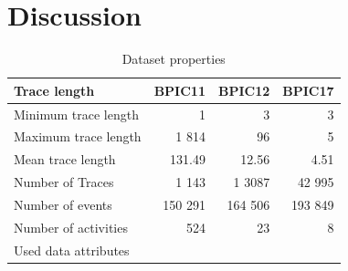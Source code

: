 \section{Discussion}
\begin{table}[]
    \centering
    \begin{tabular}{l|rrr}
    \textbf{Trace length} & \textbf{BPIC11} & \textbf{BPIC12} &  \textbf{BPIC17} \\
    \hline
    Minimum trace length & 1 & 3 & 3\\
    Maximum trace length & 1 814 & 96 & 5\\
    Mean trace length & 131.49 & 12.56 & 4.51\\
    Number of Traces & 1 143 & 1 3087 & 42 995\\
    Number of events & 150 291 & 164 506 & 193 849\\
    Number of activities & 524 & 23 & 8\\
    Used data attributes & \\
    \end{tabular}
    \caption{Dataset properties}
    \label{tab:my_label}
\end{table}